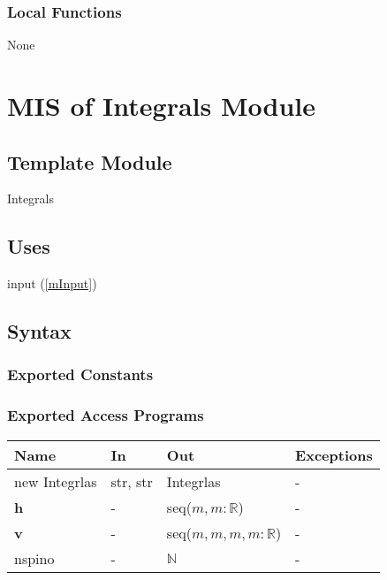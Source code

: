 \documentclass[12pt, titlepage]{article}
\begin{document}
\subsubsection{Local Functions}

None

\newpage

\section{MIS of Integrals Module} \label{mIntegrals}

\subsection{Template Module}

Integrals

\subsection{Uses}
input (\ref{mInput})

\subsection{Syntax}

\subsubsection{Exported Constants}

\subsubsection{Exported Access Programs}

\begin{center}
	\begin{tabular}{p{2.7cm} p{4cm} p{4cm} p{2cm}}
		\hline
		\textbf{Name} & \textbf{In} & \textbf{Out} & \textbf{Exceptions} \\
		\hline
		new Integrlas& str, str& Integrlas& -\\
 		\textbf{h}& -& seq($m,m:\mathbb{R}$)& -\\
 		\textbf{v}& -& seq($m,m,m,m:\mathbb{R}$)& -\\
		nspino& -& $\mathbb{N}$& -\\
		\hline
	\end{tabular}
\end{center}
\end{document}
